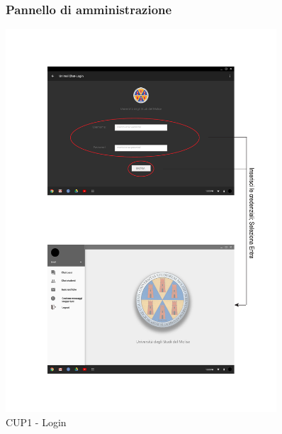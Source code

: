 \pagebreak
\begin{figure}
	\subsubsection{Pannello di amministrazione}
	\centering
	\includegraphics[width=0.9\textwidth]{imgs/gruppo6/activities/act_cup1_login.pdf}
	\caption{CUP1 - Login}
	\label{fig:act-cup1}
\end{figure}

